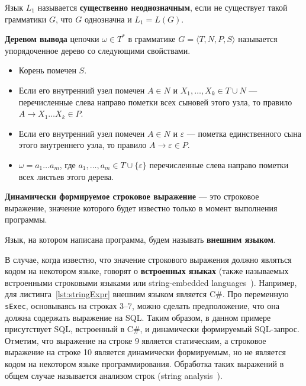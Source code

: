 \begin{mydef}    
    Язык $L_1$ называется \textbf{существенно неоднозначным}, если не существует такой грамматики $G$, что $G$ однозначна и $L_1 = L(G)$. 
\end{mydef}

\begin{mydef}
    \textbf{Деревом вывода} цепочки $\omega \in T^*$ в грамматике $G=\langle T, N, P, S \rangle$ называется упорядоченное дерево со следующими свойствами. 
\begin{itemize}
    \item Корень помечен $S$.

    \item Если его внутренний узел помечен $A \in N$ и $X_1, \ldots , X_k \in T \cup N$ ---   перечисленные слева направо пометки всех сыновей этого узла, то правило $A \rightarrow X_1 \ldots X_k \in P$.

    \item Если его внутренний узел помечен $A \in N$ и $\varepsilon$ --- пометка единственного сына этого внутреннего узла, то правило $A \rightarrow \varepsilon \in P$.

    \item $\omega = a_1 \ldots a_m$, где $a_1, \ldots , a_m \in T \cup \{\varepsilon\} $ перечисленные слева направо пометки всех листьев этого дерева.
    
\end{itemize}
\end{mydef}

\begin{mydef}    
    \textbf{Динамически формируемое строковое выражение} --- это строковое выражение, значение которого будет известно только в момент выполнения программы.
    \end{mydef}
    \begin{mydef}    
     Язык, на котором написана программа, будем называть \textbf{внешним языком}.
     \end{mydef}
     
      В случае, когда известно, что значение строкового выражения должно являться кодом на некотором языке, говорят о \textbf{встроенных языках} (также называемых встроенными строковыми языками или string-embedded languages~\cite{Alvor1}). Например, для листинга~\ref{lst:stringExpr} внешним языком является C\#. Про переменную \verb|sExec|, основываясь на строках 3--7, можно сделать предположение, что она должна содержать выражение на SQL. Таким образом, в данном примере присутствует SQL, встроенный в C\#, и динамически формируемый SQL-запрос. Отметим, что выражение на строке 9 является статическим, а строковое выражение на строке 10 является динамически формируемым, но не является кодом на некотором языке программирования. Обработка таких выражений в общем случае называется анализом строк (string analysis~\cite{StringAnalysis}).


